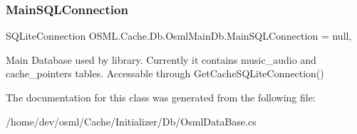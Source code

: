 \subsubsection{\texorpdfstring{MainSQLConnection}{MainSQLConnection}}
{\footnotesize\ttfamily S\+Q\+Lite\+Connection O\+S\+M\+L.\+Cache.\+Db.\+Osml\+Main\+Db.\+Main\+S\+Q\+L\+Connection = null\hspace{0.3cm}{\ttfamily [static]}, {\ttfamily [get]}}



Main Database used by library. Currently it contains music\+\_\+audio and cache\+\_\+pointers tables. Accessable through Get\+Cache\+S\+Q\+Lite\+Connection() 



The documentation for this class was generated from the following file\+:\begin{DoxyCompactItemize}
\item 
/home/dev/osml/\+Cache/\+Initializer/\+Db/Osml\+Data\+Base.\+cs\end{DoxyCompactItemize}
